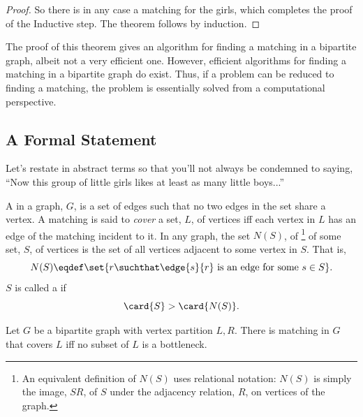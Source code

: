 \begin{proof}
So there is in any case a matching for the girls, which completes the proof of the
Inductive step.   The theorem follows by induction.
\end{proof}

The proof of this theorem gives an algorithm for finding a matching in a bipartite
graph, albeit not a very efficient one.  However, efficient algorithms for finding a
matching in a bipartite graph do exist.  Thus, if a problem can be reduced to finding
a matching, the problem is essentially solved from a computational perspective.

\subsection{A Formal Statement}

Let's restate  in abstract terms so that you'll not always be
condemned to saying, ``Now this group of little girls likes at least as many little
boys...''

%


A  in a graph, $G$, is a set of edges such that no two edges in the
set share a vertex.  A matching is said to \emph{cover} a set, $L$, of vertices iff
each vertex in $L$ has an edge of the matching incident to it.  In any graph, the set
$N(S)$, of \footnote{An equivalent definition of $N(S)$ uses
relational notation: $N(S)$ is simply the image, $SR$, of $S$ under the adjacency
relation, $R$, on vertices of the graph.} of some set, $S$, of vertices is the set of
all vertices adjacent to some vertex in $S$.  That is,
\[
N(S) \eqdef \set{r \suchthat \edge{s}{r}\text{ is an edge for some }s \in S}.
\]
$S$ is called a  if
\[
\card{S} > \card{N(S)}.
\]

\begin{theorem}
  Let $G$ be a bipartite graph with vertex partition $L,R$.  There is matching in $G$
  that covers $L$ iff no subset of $L$ is a bottleneck.
\end{theorem}

